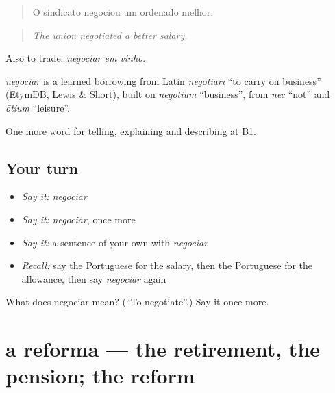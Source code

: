 \begin{quote}
O sindicato negociou um ordenado melhor.
\end{quote}

\begin{quote}
\emph{The union negotiated a better salary.}
\end{quote}

Also to trade: \emph{negociar em vinho}.

\begin{cousinweb}
\emph{negociar} is a learned borrowing from Latin \emph{negōtiārī} \textquotedblleft{}to carry on business\textquotedblright{} (EtymDB, Lewis \& Short), built on \emph{negōtium} \textquotedblleft{}business\textquotedblright{}, from \emph{nec} \textquotedblleft{}not\textquotedblright{} and \emph{ōtium} \textquotedblleft{}leisure\textquotedblright{}.
\end{cousinweb}

\begin{grammarlens}[title={What you've built}]
One more word for telling, explaining and describing at B1.
\end{grammarlens}

\subsection*{Your turn}
\begin{itemize}
\raggedright
  \item \emph{Say it:} \emph{negociar}
  \item \emph{Say it:} \emph{negociar}, once more
  \item \emph{Say it:} a sentence of your own with \emph{negociar}
  \item \emph{Recall:} say the Portuguese for the salary, then the Portuguese for the allowance, then say \emph{negociar} again
\end{itemize}

\begin{tcolorbox}[breakable,colback=teal!4,colframe=teal!35!black,title={Before you move on}]
What does negociar mean? (\textquotedblleft{}To negotiate\textquotedblright{}.) Say it once more.
\end{tcolorbox}
\section[a reforma]{a reforma — the retirement, the pension; the reform}

\label{lesson:PT-C362-reforma}



